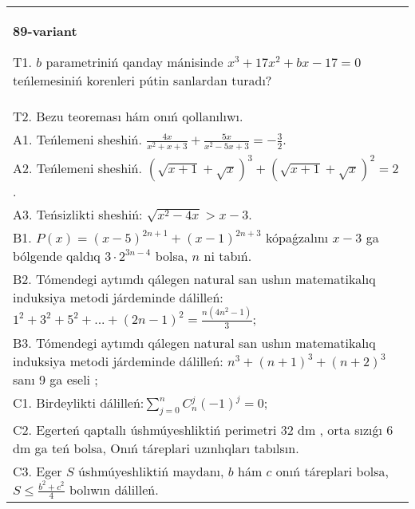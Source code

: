 \documentclass{article}
\begin{document}
\begin{tabular}{m{17cm}}
\textbf{89-variant}
\newline

T1. \(b\) parametriniń qanday mánisinde \(x^{3} + 17x^{2} + bx - 17 = 0\) teńlemesiniń korenleri pútin sanlardan turadı? \\
T2. Bezu teoreması hám onıń qollanılıwı. \\
A1. Teńlemeni sheshiń. \(\frac{4x}{x^{2} + x + 3} + \frac{5x}{x^{2} - 5x + 3} = - \frac{3}{2}\). \\
A2. Teńlemeni sheshiń. \((\sqrt{x + 1} + \sqrt{x})^{3} + (\sqrt{x + 1} + \sqrt{x})^{2} = 2\). \\
A3. Teńsizlikti sheshiń: \(\sqrt{x^{2} - 4x} > x - 3\). \\
B1. \(P(x) = (x - 5)^{2n + 1} + (x - 1)^{2n + 3}\) kópaǵzalını \(x - 3\) ga bólgende qaldıq \(3 \cdot 2^{3n - 4}\) bolsa, \(n\) ni tabıń. \\
B2. Tómendegi aytımdı qálegen natural san ushın matematikalıq induksiya metodi járdeminde dálilleń: \(1^{2} + 3^{2} + 5^{2} + ... + (2n - 1)^{2} = \frac{n\left( 4n^{2} - 1 \right)}{3}\); \\
B3. Tómendegi aytımdı qálegen natural san ushın matematikalıq induksiya metodi járdeminde dálilleń: \(n^{3} + (n + 1)^{3} + (n + 2)^{3}\) sanı 9 ga eseli ; \\
C1. Birdeylikti dálilleń:\(\sum_{j = 0}^{n}C_{n}^{j}( - 1)^{j} = 0\); \\
C2. Egerteń qaptallı úshmúyeshliktiń perimetri 32 dm , orta sızıǵı 6 dm ga teń bolsa, Onıń táreplari uzınlıqları tabılsın. \\
C3. Eger \(S\) úshmúyeshliktiń maydanı, \(b\) hám \(c\) onıń táreplari bolsa, \(S \leq \frac{b^{2} + c^{2}}{4}\) bolıwın dálilleń. \\

\end{tabular}
\vspace{1cm}
\end{document}
